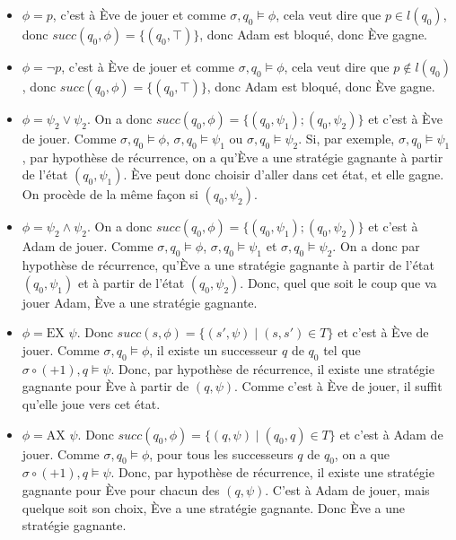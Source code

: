 \documentclass[10pt,a4paper]{article}
\begin{document}
\begin{itemize}
\item $\phi = p$, c'est à Ève de jouer et comme $\sigma,q_0 \vDash \phi$, cela veut dire que $p \in l(q_0)$, donc $succ(q_0,\phi) = \{(q_0, \top)\}$, donc Adam est bloqué, donc Ève gagne.
\item $\phi = \neg p$, c'est à Ève de jouer et comme $\sigma,q_0 \vDash \phi$, cela veut dire que $p \notin l(q_0)$, donc $succ(q_0,\phi) = \{(q_0, \top)\}$, donc Adam est bloqué, donc Ève gagne.

\item $\phi = \psi_2 \lor \psi_2$. On a donc $succ(q_0,\phi) = \{(q_0, \psi_1); (q_0, \psi_2) \}$ et c'est à Ève de jouer. Comme $\sigma,q_0 \vDash \phi$, $\sigma,q_0 \vDash \psi_1$ ou $\sigma,q_0 \vDash \psi_2$. Si, par exemple, $\sigma,q_0 \vDash \psi_1$, par hypothèse de récurrence, on a qu'Ève a une stratégie gagnante à partir de l'état $(q_0, \psi_1)$. Ève peut donc choisir d'aller dans cet état, et elle gagne. On procède de la même façon si $(q_0, \psi_2)$.

\item $\phi = \psi_2 \land \psi_2$. On a donc $succ(q_0,\phi) = \{(q_0, \psi_1); (q_0, \psi_2) \}$ et c'est à Adam de jouer. Comme $\sigma,q_0 \vDash \phi$, $\sigma,q_0 \vDash \psi_1$ et $\sigma,q_0 \vDash \psi_2$. On a donc par hypothèse de récurrence, qu'Ève a une stratégie gagnante à partir de l'état $(q_0, \psi_1)$ et à partir de l'état $(q_0, \psi_2)$. Donc, quel que soit le coup que va jouer Adam, Ève a une stratégie gagnante.

\item $\phi = \mbox{EX } \psi$. Donc $succ(s, \phi) = \{ (s', \psi) \mid (s,s') \in T \} $ et c'est à Ève de jouer. Comme $\sigma,q_0 \vDash \phi$, il existe un successeur $q$ de $q_0$ tel que $\sigma\circ (+ 1),q \vDash \psi$. Donc, par hypothèse de récurrence, il existe une stratégie gagnante pour Ève à partir de $(q, \psi)$. Comme c'est à Ève de jouer, il suffit qu'elle joue vers cet état.

\item $\phi = \mbox{AX } \psi$. Donc $succ(q_0, \phi) = \{ (q, \psi) \mid (q_0,q) \in T \} $ et c'est à Adam de jouer. Comme $\sigma,q_0 \vDash \phi$, pour tous les successeurs $q$ de $q_0$, on a que $\sigma\circ (+ 1),q \vDash \psi$. Donc, par hypothèse de récurrence, il existe une stratégie gagnante pour Ève pour chacun des $(q, \psi)$. C'est à Adam de jouer, mais quelque soit son choix, Ève a une stratégie gagnante. Donc Ève a une stratégie gagnante.


\end{itemize}
\end{document}
